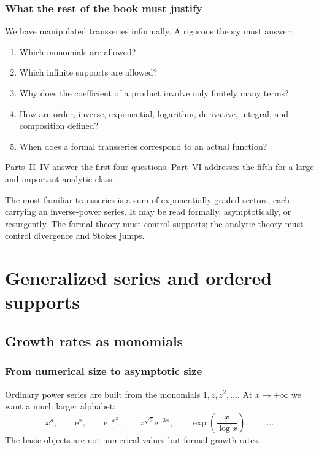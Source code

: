 \documentclass[11pt,oneside]{book}
\theoremstyle{definition}
\theoremstyle{remark}
\newcommand{\e}{\mathrm{e}}
\begin{document}
\section{What the rest of the book must justify}

We have manipulated transseries informally. A rigorous theory must answer:

\begin{enumerate}
\item Which monomials are allowed?
\item Which infinite supports are allowed?
\item Why does the coefficient of a product involve only finitely many terms?
\item How are order, inverse, exponential, logarithm, derivative, integral, and
      composition defined?
\item When does a formal transseries correspond to an actual function?
\end{enumerate}

Parts~II--IV answer the first four questions. Part~VI addresses the fifth for a
large and important analytic class.

\begin{summarybox}
The most familiar transseries is a sum of exponentially graded sectors, each
carrying an inverse-power series. It may be read formally, asymptotically, or
resurgently. The formal theory must control supports; the analytic theory must
control divergence and Stokes jumps.
\end{summarybox}


\part{Generalized series and ordered supports}

\chapter{Growth rates as monomials}
\label{ch:monomials}

\section{From numerical size to asymptotic size}

Ordinary power series are built from the monomials
$1,z,z^2,\ldots$. At $x\to+\infty$ we want a much larger alphabet:
\[
  x^a,\qquad \e^{x},\qquad \e^{-x^2},\qquad
  x^{\sqrt2}\e^{-3x},\qquad
  \exp\!\left(\frac{x}{\log x}\right),\qquad\ldots
\]
The basic objects are not numerical values but formal growth rates.
\end{document}
